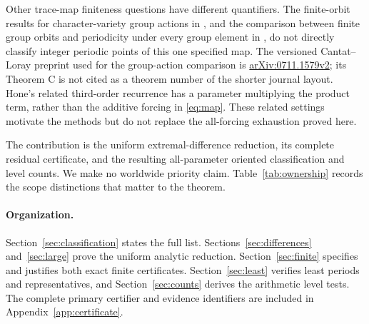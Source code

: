 Other trace-map finiteness questions have different quantifiers.
The finite-orbit results for character-variety group actions in
\citet{cantatLoray2009}, and the comparison between finite group
orbits and periodicity under every group element in
\citet{humphries2016}, do not directly classify integer periodic
points of this one specified map. The versioned Cantat--Loray
preprint used for the group-action comparison is
\href{https://arxiv.org/abs/0711.1579v2}{arXiv:0711.1579v2}; its
Theorem C is not cited as a theorem number of the shorter journal
layout. Hone's related third-order recurrence
\citep[Proposition 1]{hone2006} has a parameter multiplying the
product term, rather than the additive forcing in
\eqref{eq:map}. These related settings motivate the methods but
do not replace the all-forcing exhaustion proved here.

The contribution is the uniform extremal-difference reduction,
its complete residual certificate, and the resulting all-parameter
oriented classification and level counts. We make no worldwide
priority claim. Table~\ref{tab:ownership} records the scope
distinctions that matter to the theorem.


\paragraph{Organization.}
Section~\ref{sec:classification} states the full list.
Sections~\ref{sec:differences} and~\ref{sec:large} prove the
uniform analytic reduction. Section~\ref{sec:finite} specifies
and justifies both exact finite certificates.
Section~\ref{sec:least} verifies least periods and representatives,
and Section~\ref{sec:counts} derives the arithmetic level tests.
The complete primary certifier and evidence identifiers are included
in Appendix~\ref{app:certificate}.
